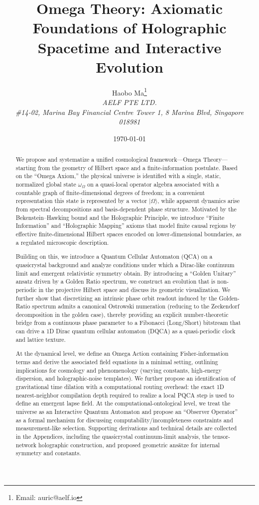 \documentclass[11pt,a4paper]{article}
\title{Omega Theory: Axiomatic Foundations of Holographic Spacetime and Interactive Evolution}
\author{Haobo Ma\thanks{Email: auric@aelf.io} \\
\textit{AELF PTE LTD.} \\
\textit{\#14-02, Marina Bay Financial Centre Tower 1, 8 Marina Blvd, Singapore 018981}}
\date{\today}
\begin{document}
\maketitle

\begin{abstract}
We propose and systematize a unified cosmological framework---Omega Theory---starting from the geometry of Hilbert space and a finite-information postulate. Based on the ``Omega Axiom,'' the physical universe is identified with a single, static, normalized global state $\omega_{\Omega}$ on a quasi-local operator algebra associated with a countable graph of finite-dimensional degrees of freedom; in a convenient representation this state is represented by a vector $|\Omega\rangle$, while apparent dynamics arise from spectral decompositions and basis-dependent phase structure. Motivated by the Bekenstein--Hawking bound and the Holographic Principle, we introduce ``Finite Information'' and ``Holographic Mapping'' axioms that model finite causal regions by effective finite-dimensional Hilbert spaces encoded on lower-dimensional boundaries, as a regulated microscopic description.

Building on this, we introduce a Quantum Cellular Automaton (QCA) on a quasicrystal background and analyze conditions under which a Dirac-like continuum limit and emergent relativistic symmetry obtain. By introducing a ``Golden Unitary'' ansatz driven by a Golden Ratio spectrum, we construct an evolution that is non-periodic in the projective Hilbert space and discuss its geometric visualization.
We further show that discretizing an intrinsic phase orbit readout induced by the Golden-Ratio spectrum admits a canonical Ostrowski numeration (reducing to the Zeckendorf decomposition in the golden case), thereby providing an explicit number-theoretic bridge from a continuous phase parameter to a Fibonacci (Long/Short) bitstream that can drive a 1D Dirac quantum cellular automaton (DQCA) as a quasi-periodic clock and lattice texture.

At the dynamical level, we define an Omega Action containing Fisher-information terms and derive the associated field equations in a minimal setting, outlining implications for cosmology and phenomenology (varying constants, high-energy dispersion, and holographic-noise templates). We further propose an identification of gravitational time dilation with a computational routing overhead: the exact 1D nearest-neighbor compilation depth required to realize a local PQCA step is used to define an emergent lapse field. At the computational-ontological level, we treat the universe as an Interactive Quantum Automaton and propose an ``Observer Operator'' as a formal mechanism for discussing computability/incompleteness constraints and measurement-like selection. Supporting derivations and technical details are collected in the Appendices, including the quasicrystal continuum-limit analysis, the tensor-network holographic construction, and proposed geometric ans\"atze for internal symmetry and constants.
\end{abstract}
\end{document}
